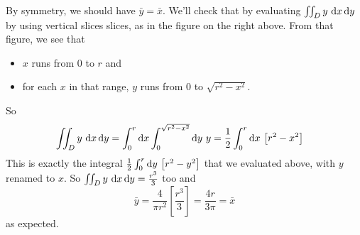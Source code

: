 \begin{eg}
By symmetry, we should have $\bar y=\bar x$. We'll check that
by evaluating $\dblInt_D y\ \dee{x}\,\dee{y}$ by using vertical slices
slices, as in the figure on the right above. 
From that figure, we see that
\begin{itemize}
\item 
$x$ runs from $0$ to $r$ and
\item
for each $x$ in that range, $y$ runs from $0$ to $\sqrt{r^2-x^2}$.
\end{itemize}
So
\begin{align*}
\iint_D y\ \mathrm{d}x\,\mathrm{d}y
&= \int_0^r\mathrm{d}x\int_0^{\sqrt{r^2-x^2}}\mathrm{d}y \ y 
= \frac{1}{2}\int_0^r\mathrm{d}x\  \big[r^2-x^2\big] 
\end{align*}
This is exactly the  integral $\frac{1}{2} \int_0^r\dee{y}\ \big[r^2-y^2\big]$
that we evaluated above,  with $y$ renamed to $x$. 
So $\dblInt_D y\ \dee{x}\,\dee{y}=\frac{r^3}{3}$
too and
\begin{equation*}
\bar y 
= \frac{4}{\pi r^2}\left[\frac{r^3}{3}\right]
=\frac{4r}{3\pi}
=\bar x
\end{equation*}
as expected.
\end{eg}



%
%
%


